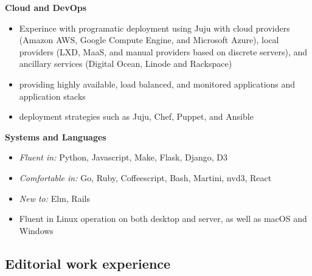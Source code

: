 \documentclass[letterpaper]{memoir}
\begin{document}
\hspace{-1.5em}\textbf{Cloud and DevOps}

\begin{itemize}
  \item Experince with programatic deployment using Juju with cloud providers (Amazon AWS, Google Compute Engine, and Microsoft Azure), local providers (LXD, MaaS, and manual providers based on discrete servers), and ancillary services (Digital Ocean, Linode and Rackspace)
  \item providing highly available, load balanced, and monitored applications and application stacks
  \item deployment strategies such as Juju, Chef, Puppet, and Ansible
\end{itemize}

\hspace{-1.5em}\textbf{Systems and Languages}

\begin{itemize}
  \item \textit{Fluent in:} Python, Javascript, Make, Flask, Django, D3
  \item \textit{Comfortable in:} Go, Ruby, Coffeescript, Bash, Martini, nvd3, React
  \item \textit{New to:} Elm, Rails
  \item Fluent in Linux operation on both desktop and server, as well as macOS and Windows
\end{itemize}

\newpage

\subsection{Editorial work experience}
\end{document}
